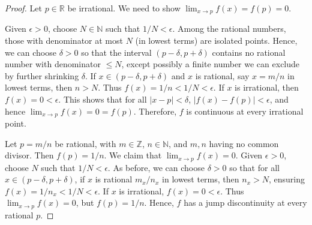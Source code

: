 \documentclass[11pt]{article}
\begin{document}
\begin{exercise}{18}
    \begin{proof}
        Let $p \in \mathbb{R}$ be irrational. We need to show $\lim_{x \to p} f(x) = f(p) = 0$.

Given $\epsilon > 0$, choose $N \in \mathbb{N}$ such that $1/N < \epsilon$. Among the rational numbers, those with denominator at most $N$ (in lowest terms)
are isolated points. Hence, we can choose $\delta > 0$ so that the interval
$(p-\delta, p+\delta)$ contains no rational number with denominator $\le N$,
except possibly a finite number we can exclude by further shrinking $\delta$. If $x \in (p-\delta, p+\delta)$ and $x$ is rational, say $x = m/n$ in lowest terms,
then $n > N$. Thus $f(x) = 1/n < 1/N < \epsilon$. If $x$ is irrational, then
$f(x)=0 < \epsilon$. This shows that for all $|x-p|<\delta$, $|f(x)-f(p)|<\epsilon$, and hence
$\lim_{x\to p} f(x)=0=f(p)$. Therefore, $f$ is continuous at every irrational point.

Let $p = m/n$ be rational, with $m \in \mathbb{Z}$, $n \in \mathbb{N}$, and $m,n$ having no common divisor. Then $f(p) = 1/n$. We claim that $\lim_{x\to p} f(x) = 0$. Given $\epsilon > 0$, choose $N$ such that $1/N<\epsilon$. As before, we can choose $\delta > 0$ so that for all $x \in (p-\delta,p+\delta)$, if $x$ is rational $m_x/n_x$ in lowest terms, then $n_x > N$, ensuring $f(x)=1/n_x<1/N<\epsilon$. If $x$ is irrational, $f(x)=0<\epsilon$. Thus $\lim_{x\to p} f(x)=0$, but $f(p)=1/n$. Hence, $f$ has a jump discontinuity
at every rational $p$.
    \end{proof}
\end{exercise}
\end{document}
